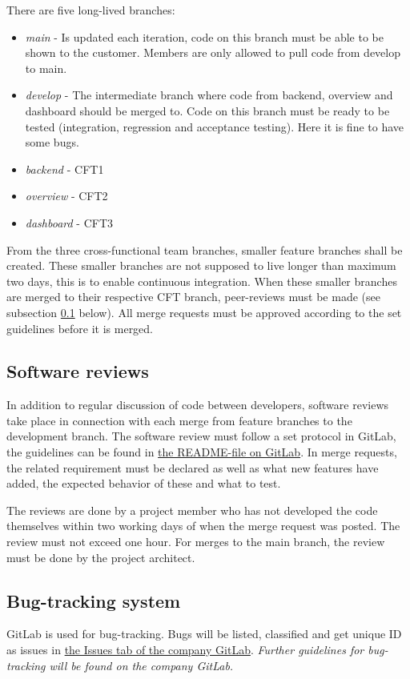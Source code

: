 There are five long-lived branches:
\begin{itemize}
\item \emph{main} - Is updated each iteration, code on this branch must be able to be shown to the customer. Members are only allowed to pull code from develop to main.
\item \emph{develop} - The intermediate branch where code from backend, overview and dashboard should be merged to. Code on this branch must be ready to be tested (integration, regression and acceptance testing). Here it is fine to have some bugs.
\item \emph{backend} - CFT1
\item \emph{overview} - CFT2
\item \emph{dashboard} - CFT3
\end{itemize}

From the three cross-functional team branches, smaller feature branches shall be created. These smaller branches are not supposed to live longer than maximum two days, this is to enable continuous integration. When these smaller branches are merged to their respective CFT branch, peer-reviews must be made (see subsection \ref{subsec:reviews} below). 
All merge requests must be approved according to the set guidelines before it is merged.

\subsection{Software reviews}
\label{subsec:reviews}
In addition to regular discussion of code between developers, software reviews take place in connection with each merge from feature branches to the development branch. The software review must follow a set protocol in GitLab, the guidelines can be found in \href{https://gitlab.liu.se/tddc88-company-1-2021/deploy/-/blob/develop/README.md}{the README-file on GitLab}. In merge requests, the related requirement must be declared as well as what new features have added, the expected behavior of these and what to test.

The reviews are done by a project member who has not developed the code themselves within two working days of when the merge request was posted. The review must not exceed one hour. For merges to the main branch, the review must be done by the project architect.

\subsection{Bug-tracking system}
GitLab is used for bug-tracking. Bugs will be listed, classified and get unique ID as issues in \href{https://gitlab.liu.se/tddc88-company-1-2021/deploy/-/issues}{the Issues tab of the company GitLab}. \emph{Further guidelines for bug-tracking will be found on the company GitLab.}

